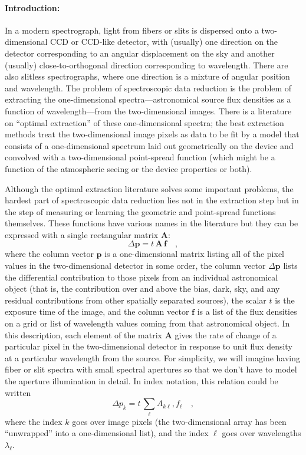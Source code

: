 \documentclass[12pt]{article}
\newcommand{\hmatrix}[1]{\boldsymbol{#1}}
\newcommand{\Amatrix}{\hmatrix{A}}
\newcommand{\pixels}{\hmatrix{p}}
\newcommand{\flux}{\hmatrix{f}}
\newcommand{\exptime}{t}
\begin{document}
\paragraph{Introduction:}
In a modern spectrograph, light from fibers or slits is dispersed onto
a two-dimensional CCD or CCD-like detector, with (usually) one
direction on the detector corresponding to an angular displacement on
the sky and another (usually) close-to-orthogonal direction
corresponding to wavelength.  There are also slitless spectrographs,
where one direction is a mixture of angular position and wavelength.
The problem of spectroscopic data reduction is the problem of
extracting the one-dimensional spectra---astronomical source flux
densities as a function of wavelength---from the two-dimensional
images.  There is a literature on ``optimal extraction'' of these
one-dimensional spectra; the best extraction methods treat the
two-dimensional image pixels as data to be fit by a model that
consists of a one-dimensional spectrum laid out geometrically on the
device and convolved with a two-dimensional point-spread function
(which might be a function of the atmospheric seeing or the device
properties or both).

Although the optimal extraction literature solves some important
problems, the hardest part of spectroscopic data reduction lies not in
the extraction step but in the step of measuring or learning the
geometric and point-spread functions themselves.  These functions have
various names in the literature but they can be expressed with a
single rectangular matrix $\Amatrix$:
\begin{equation}
\Delta\pixels = \exptime\,\Amatrix\,\flux \quad ,
\end{equation}
where the column vector $\pixels$ is a one-dimensional matrix listing
all of the pixel values in the two-dimensional detector in some order,
the column vector $\Delta\pixels$ lists the differential contribution
to those pixels from an individual astronomical object (that is, the
contribution over and above the bias, dark, sky, and any residual
contributions from other spatially separated sources), the scalar
$\exptime$ is the exposure time of the image, and the column vector
$\flux$ is a list of the flux densities on a grid or list of
wavelength values coming from that astronomical object.  In this
description, each element of the matrix $\Amatrix$ gives the rate of
change of a particular pixel in the two-dimensional detector in
response to unit flux density at a particular wavelength from the
source.  For simplicity, we will imagine having fiber or slit spectra
with small spectral apertures so that we don't have to model the
aperture illumination in detail.  In index notation, this relation
could be written
\begin{equation}
\Delta p_k = \exptime\,\sum_{\ell} A_{k\ell},f_{\ell} \quad ,
\end{equation}
where the index $k$ goes over image pixels (the two-dimensional array
has been ``unwrapped'' into a one-dimensional list), and the index
$\ell$ goes over wavelengths $\lambda_{\ell}$.
\end{document}
